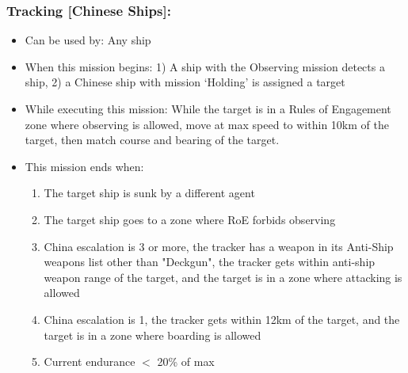 \documentclass{article}
\begin{document}
    \subsubsection{Tracking [Chinese Ships]:}
            \begin{itemize}
                \item{Can be used by:} Any ship
                \item{When this mission begins:} 1) A ship with the Observing mission detects a ship, 2) a Chinese ship with mission `Holding' is assigned a target
                \item{While executing this mission:} While the target is in a Rules of Engagement zone where observing is allowed, move at max speed to within 10km of the target, then match course and bearing of the target.
                \item{This mission ends when:} 
                    \begin{enumerate}[label=\arabic*)]
                    \item The target ship is sunk by a different agent \par
                    [hunter resumes player-assigned mission]
                    \item The target ship goes to a zone where RoE forbids observing \par
                    [hunter resumes player-assigned mission]
                    \item China escalation is 3 or more, the tracker has a weapon in its Anti-Ship weapons list other than "Deckgun", the tracker gets within anti-ship weapon range of the target, and the target is in a zone where attacking is allowed \par
                    [hunter begins Attacking - Non-Deckgun]
                    \item China escalation is 1, the tracker gets within 12km of the target, and the target is in a zone where boarding is allowed \par
                    [hunter begins boarding]
                    \item Current endurance $<$ 20\% of max \par
                    [hunter transits to base]
                    \end{enumerate}
            \end{itemize}
\end{document}
